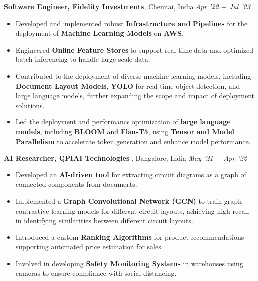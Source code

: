 \documentclass[10pt,a4]{article}
\begin{document}
{\begin{flushleft}
\begin{itemize}
    \end{itemize}	
    \vspace{0.5mm}
    \textbf{\large Software Engineer, Fidelity Investments},  Chennai, India \hfill \textit{\large Apr '22 $-$ Jul '23}	\\
    \begin{itemize}
        \item Developed and implemented robust \textbf{Infrastructure and Pipelines} for the deployment of \textbf{Machine Learning Models} on \textbf{AWS}.  
         \item Engineered \textbf{Online Feature Stores} to support real-time data and optimized batch inferencing to handle large-scale data.
         \item Contributed to the deployment of diverse machine learning models, including \textbf{Document Layout Models}, \textbf{YOLO} for real-time object detection, and large language models, further expanding the scope and impact of deployment solutions.
         \item Led the deployment and performance optimization of \textbf{large language models}, including \textbf{BLOOM} and \textbf{Flan-T5}, using \textbf{Tensor and Model Parallelism} to accelerate token generation and enhance model performance.
    \end{itemize}	

    \textbf{\large AI Researcher, QPIAI Technologies },  Bangalore, India \hfill \textit{\large May '21 $-$ Apr '22}	\\
    \begin{itemize}
          
        \item Developed an \textbf{AI-driven tool} for extracting circuit diagrams as a graph of connected components from documents.
        \item Implemented a \textbf{Graph Convolutional Network (GCN)} to train graph contrastive learning models for different circuit layouts, achieving high recall in identifying similarities between different circuit layouts.
        \item Introduced a custom \textbf{Ranking Algorithms} for product recommendations supporting automated price estimation for sales.
        \item Involved in developing \textbf{Safety Monitoring Systems} in warehouses using cameras to ensure compliance with social distancing.
    \end{itemize}		


\end{flushleft}}
\end{document}
